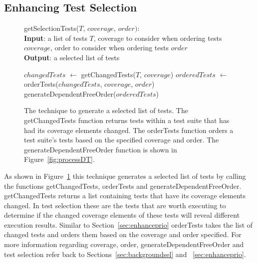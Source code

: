 \subsection{Enhancing Test Selection}
\label{sec:enhancesel}
\begin{figure}[t]
	getSelectionTests($\mathit{T}$, $\mathit{coverage}$, $\mathit{order}):$\\
	\textbf{Input}: a list of tests $\mathit{T}$, coverage to consider when ordering
	tests $\mathit{coverage}$, order to consider when ordering tests $\mathit{order}$\\
	\textbf{Output}: a selected list of tests\\
	 \begin{algorithmic}[1]
	 	\vspace{-5mm}
	 	\STATE $\mathit{changedTests}$ $\leftarrow$ getChangedTests($\mathit{T}$,
	 	$\mathit{coverage}$)
		\STATE $\mathit{orderedTests}$ $\leftarrow$ orderTests($\mathit{changedTests}$,
		$\mathit{coverage}$, $\mathit{order}$)
		\RETURN generateDependentFreeOrder($\mathit{orderedTests}$)
	\end{algorithmic}
	\vspace{-3mm}
	\caption {
		The technique to generate a selected list of tests. The
		getChangedTests function returns tests within a test suite that has had its
		coverage elements changed. The orderTests function orders a test suite's tests
		based on the specified coverage and order. The generateDependentFreeOrder function
		is shown in Figure~\ref{fig:processDT}. 
	}
	\label{fig:selection}
\end{figure}
As shown in Figure~\ref{fig:selection} this technique generates a selected
list of tests by calling the functions getChangedTests, orderTests and
generateDependentFreeOrder. getChangedTests returns a list containing tests
that have its coverage elements changed. In test selection these are the tests
that are worth executing to determine if the changed coverage elements of these
tests will reveal different execution results. Similar to Section~\ref{sec:enhanceprio}
orderTests takes the list of changed tests and orders them based on the coverage
and order specified. For more information regarding coverage, order,
generateDependentFreeOrder and test selection refer back to Sections~\ref{sec:backgroundsel}
and ~\ref{sec:enhanceprio}.

